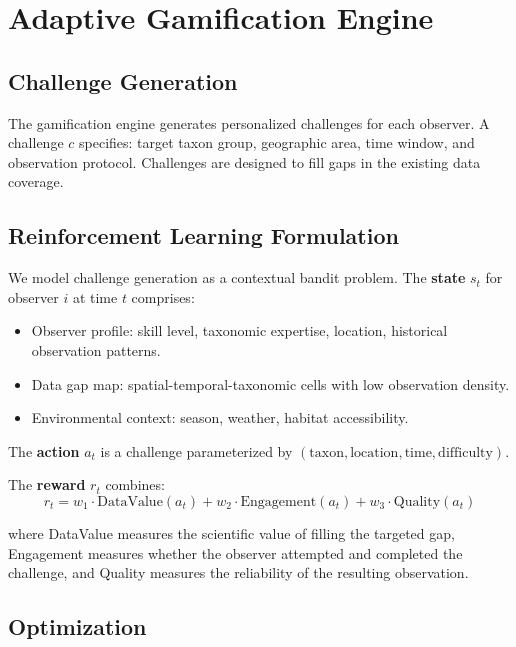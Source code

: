 \section{Adaptive Gamification Engine}

\label{sec:gamification}

\subsection{Challenge Generation}

The gamification engine generates personalized challenges for each
observer. A challenge $c$ specifies: target taxon group, geographic
area, time window, and observation protocol. Challenges are designed
to fill gaps in the existing data coverage.

\subsection{Reinforcement Learning Formulation}

We model challenge generation as a contextual bandit problem. The
\textbf{state} $s_t$ for observer $i$ at time $t$ comprises:
\begin{itemize}
  \item Observer profile: skill level, taxonomic expertise, location,
    historical observation patterns.
  \item Data gap map: spatial-temporal-taxonomic cells with low
    observation density.
  \item Environmental context: season, weather, habitat accessibility.
\end{itemize}

The \textbf{action} $a_t$ is a challenge parameterized by
$(\text{taxon}, \text{location}, \text{time}, \text{difficulty})$.

The \textbf{reward} $r_t$ combines:
\begin{equation}
  r_t = w_1 \cdot \text{DataValue}(a_t) + w_2 \cdot \text{Engagement}(a_t)
  + w_3 \cdot \text{Quality}(a_t)
  \label{eq:reward}
\end{equation}

where DataValue measures the scientific value of filling the targeted
gap, Engagement measures whether the observer attempted and completed
the challenge, and Quality measures the reliability of the resulting
observation.

\subsection{Optimization}

